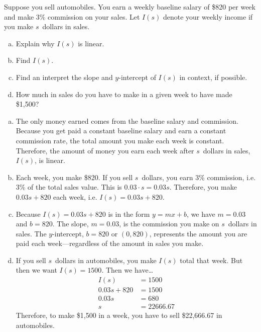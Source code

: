 \documentclass[11pt,letterpaper]{article}
\begin{document}
\newpage



 Suppose you sell automobiles. You earn a weekly baseline salary of \$820 per week and make 3\% commission on your sales. Let $I(s)$ denote your weekly income if you make $s$~dollars in sales. 
	\begin{enumerate}[(a)]
	\item Explain why $I(s)$ is linear. 
	\item Find $I(s)$.
	\item Find an interpret the slope and $y$-intercept of $I(s)$ in context, if possible. 
	\item How much in sales do you have to make in a given week to have made \$1,500?
	\end{enumerate} \pspace

\sol 
\begin{enumerate}[(a)]
\item The only money earned comes from the baseline salary and commission. Because you get paid a constant baseline salary and earn a constant commission rate, the total amount you make each week is constant. Therefore, the amount of money you earn each week after $s$~dollars in sales, $I(s)$, is linear. 

\item Each week, you make \$820. If you sell $s$~dollars, you earn 3\% commission, i.e. 3\% of the total sales value. This is $0.03 \cdot s= 0.03s$. Therefore, you make $0.03s + 820$ each week, i.e. $I(s)= 0.03s + 820$. 

\item Because $I(s)= 0.03s + 820$ is in the form $y= mx + b$, we have $m= 0.03$ and $b= 820$. The slope, $m= 0.03$, is the commission you make on $s$~dollars in sales. The $y$-intercept, $b= 820$ or $(0, 820)$, represents the amount you are paid each week---regardless of the amount in sales you make. 

\item If you sell $s$~dollars in automobiles, you make $I(s)$ total that week. But then we want $I(s)= 1500$. Then we have\dots
	\[
	\begin{aligned}
	I(s)&= 1500 \\[0.3cm]
	0.03s + 820&= 1500 \\[0.3cm]
	0.03s&= 680 \\[0.3cm]
	s&= 22666.67
	\end{aligned}
	\]
Therefore, to make \$1,500 in a week, you have to sell \$22,666.67 in automobiles. 
\end{enumerate}
\end{document}

